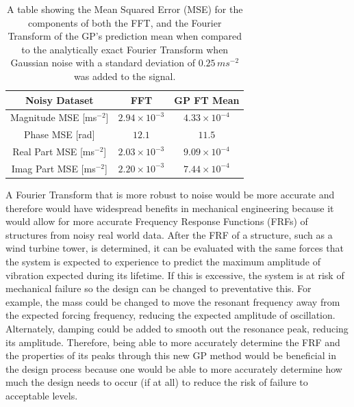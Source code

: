 \documentclass[12pt]{article}
\begin{document}
    \begin{table}[h]
        \centering %
        \setlength{\arrayrulewidth}{1pt} %
        \begin{tabular}{|c|c|c|} %
            \hline
            Noisy Dataset & FFT & GP FT Mean \\ %
            \hline
            Magnitude MSE [ms$^{-2}$] & $2.94 \times 10^{-3}$ & $4.33 \times 10^{-4}$ \\ %
            \hline
            Phase MSE [rad] & $12.1$ & $11.5$ \\ %
            \hline
            Real Part MSE [ms$^{-2}$] & $2.03 \times 10^{-3}$ & $9.09 \times 10^{-4}$ \\ %
            \hline
            Imag Part MSE [ms$^{-2}$] & $2.20 \times 10^{-3}$ & $7.44 \times 10^{-4}$ \\ %
            \hline
        \end{tabular}
        \caption{A table showing the Mean Squared Error (MSE) for the components of both the FFT, and the Fourier Transform of the GP's prediction mean when compared to the analytically exact Fourier Transform when Gaussian noise with a standard deviation of $0.25 \, ms^{-2}$ was added to the signal.}
        \label{tab:response-noise}
    \end{table}

    A Fourier Transform that is more robust to noise would be more accurate and therefore would have widespread benefits in mechanical engineering because it would allow for more accurate Frequency Response Functions (FRFs) of structures from noisy real world data.
    After the FRF of a structure, such as a wind turbine tower, is determined, it can be evaluated with the same forces that the system is expected to experience to predict the maximum amplitude of vibration expected during its lifetime.
    If this is excessive, the system is at risk of mechanical failure so the design can be changed to preventative this.
    For example, the mass could be changed to move the resonant frequency away from the expected forcing frequency, reducing the expected amplitude of oscillation.
    Alternately, damping could be added to smooth out the resonance peak, reducing its amplitude.
    Therefore, being able to more accurately determine the FRF and the properties of its peaks through this new GP method would be beneficial in the design process because one would be able to more accurately determine how much the design needs to occur (if at all) to reduce the risk of failure to acceptable levels.
\end{document}
